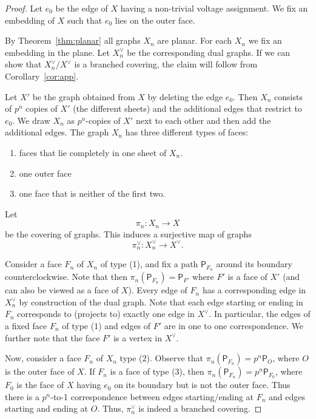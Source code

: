 \documentclass{amsart}
\newcommand{\KM}[1]{\textcolor{OliveGreen}{#1}}
\numberwithin{equation}{section}
\theoremstyle{remark}
\theoremstyle{plain} %
\begin{document}
\begin{proof}
{Let $e_0$ be the edge of $X$ having a non-trivial voltage assignment.
We fix an embedding of $X$ such that $e_0$ lies on the outer face.}

{By Theorem~\ref{thm:planar} all graphs $X_n$ are planar.
For each $X_n$ we fix an embedding in the plane.
Let $X_n^\vee $ be the corresponding dual graphs.
If we can show that $X_n^\vee/X^\vee $ is a branched covering, the claim will follow from Corollary~\ref{cor:app}. }

{Let $X'$ be the graph obtained from $X$ by deleting the edge $e_0$.
Then $X_n$ consists of $p^n$ copies of $X'$ (the different sheets) and the additional edges that restrict to $e_0$.
We draw $X_n$ as $p^n$-copies of $X'$ next to each other and then add the additional edges.
The graph $X_n$ has three different types of faces: 
\begin{enumerate}
    \item faces that lie completely in one sheet of $X_n$.
    \item one outer face
    \item one face that is neither of the first two.
\end{enumerate}
Let
\[
\pi_n\colon X_n \longrightarrow X
\]
be the covering of graphs.
This induces a surjective map of graphs
\[
\pi^\vee_n\colon X_n^\vee \longrightarrow X^\vee.
\]}
{Consider a face $F_{{n}}$ of $X_n$ of type (1), and fix a path $\mathsf{P}_{F_n}$ around its boundary counterclockwise.
Note that then $\pi_n(\mathsf{P}_{F_{{n}}})=\mathsf{P}_{F'}$ where $F'$ is a face of $X'$ (and can also be viewed as a face of $X$).
Every edge of $F_n$ has a corresponding edge in $X_n^\vee$ by construction of the dual graph.
Note that each edge starting or ending in $F_{{n}}$ corresponds to (projects to) exactly one edge in $X^\vee$.
In particular, the edges of a fixed face $F_{n}$ of type (1) and edges of $F'$ are in one to one correspondence.
We further note that the face $F'$ is a vertex in $X^\vee$.}

{Now, consider a face $F_{n}$ of $X_n$ type (2).
Observe that $\pi_n(\mathsf{P}_{F_{n}})=p^n \mathsf{P}_O$, where $O$ is the outer face of $X$.
If $F_n$ is a face of type (3), then $\pi_n(\mathsf{P}_{F_n})=p^n \mathsf{P}_{F_0}$, where $F_0$ is the face of $X$ having $e_0$ on its boundary but is not the outer face. 
Thus there is a $p^n$-to-1 correspondence between edges starting/ending at $F_{n}$ and edges starting and ending at $O$.
Thus, $\pi^\vee_n$ is indeed a branched covering.}
\end{proof}



\end{document}
